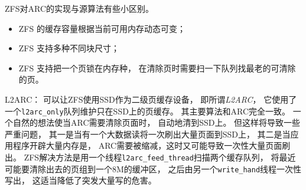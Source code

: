 ZFS对ARC的实现与源算法有些小区别。
\begin{itemize}
  \item ZFS 的缓存容量根据当前可用内存动态可变；
  \item ZFS 支持多种不同块尺寸；
  \item ZFS 支持把一个页锁在内存种，
    在清除页时需要扫一下队列找最老的可清除的页。
\end{itemize}

L2ARC：
可以让ZFS使用SSD作为二级页缓存设备，
即所谓{\em L2ARC}，
它使用了一个\verb|l2arc_only|队列维护只在SSD上的页缓存。
其主要算法和ARC完全一致。
一个自然的想法使当ARC需要清除页面时，
自动地清到SSD上。
但这样将导致一些严重问题，
其一是当有一个大数据读将一次刷出大量页面到SSD上，
其二是当应用程序开辟大量内存是，
ARC需要被缩减，这时又可能导致一次性大量页面刷出。
ZFS解决方法是用一个线程\verb|l2arc_feed_thread|扫描两个缓存队列，
将最近可能要清除出去的页组到一个8M的缓冲区，
之后由另一个\verb|write_hand|线程一次性写出，
这适当降低了突发大量写的危害。
